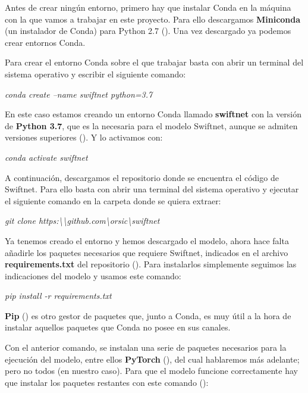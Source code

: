 Antes de crear ningún entorno, primero hay que instalar Conda en la máquina con la que vamos a trabajar en este proyecto. Para ello descargamos \textbf{Miniconda} (un instalador de Conda) para Python 2.7 (\cite{miniconda_install}). Una vez descargado ya podemos crear entornos Conda.


Para crear el entorno Conda sobre el que trabajar basta con abrir un terminal del sistema operativo y escribir el siguiente comando:

\begin{center}
\textit{conda create --name swiftnet python=3.7}
\end{center}

En este caso estamos creando un entorno Conda llamado \textbf{swiftnet} con la versión de \textbf{Python 3.7}, que es la necesaria para el modelo Swiftnet, aunque se admiten versiones superiores  (\cite{github_swiftnet}). Y lo activamos con:

\begin{center}
\textit{conda activate swiftnet}
\end{center}

A continuación, descargamos el repositorio donde se encuentra el código de Swiftnet. Para ello basta con abrir una terminal del sistema operativo y ejecutar el siguiente comando en la carpeta donde se quiera extraer:

\begin{center}
\textit{git clone https:\textbackslash{}\textbackslash{github.com}\textbackslash{orsic}\textbackslash{swiftnet}}
\end{center}

Ya tenemos creado el entorno y hemos descargado el modelo, ahora hace falta añadirle los paquetes necesarios que requiere Swiftnet, indicados en el archivo \textbf{requirements.txt} del repositorio (\cite{github_swiftnet}). Para instalarlos simplemente seguimos las indicaciones del modelo y usamos este comando:

\begin{center}
\textit{pip install -r requirements.txt}
\end{center}

\textbf{Pip} (\cite{pip}) es otro gestor de paquetes que, junto a Conda, es muy útil a la hora de instalar aquellos paquetes que Conda no posee en sus canales.

Con el anterior comando, se instalan una serie de paquetes necesarios para la ejecución del modelo, entre ellos \textbf{PyTorch} (\cite{pytorch}), del cual hablaremos más adelante; pero no todos (en nuestro caso). Para que el modelo funcione correctamente hay que instalar los paquetes restantes con este comando (\cite{conda_sheet}):

